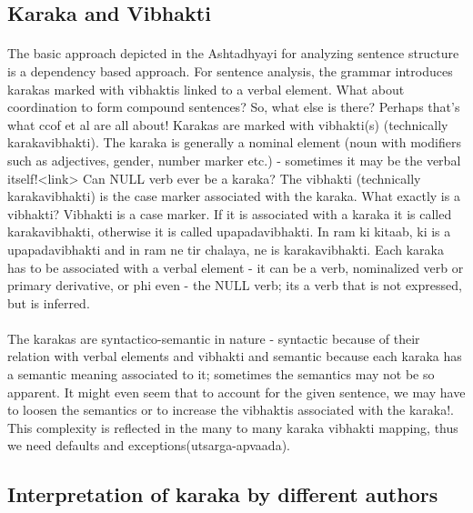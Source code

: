 \documentclass[a4paper,10pt]{article}
\begin{document}
\subsection{Karaka and Vibhakti}
\paragraph{}The basic approach depicted in the Ashtadhyayi for analyzing sentence structure is a dependency based approach. \color{blue!100}For sentence analysis, the grammar introduces karakas marked with vibhaktis linked to a verbal element. \color{red!100}What about coordination to form compound sentences? So, what else is there? \color{green!100}Perhaps that's what ccof et al are all about! \color{black!100}Karakas are marked with vibhakti(s) (technically karakavibhakti). \color{blue!100}The karaka is generally a nominal element (noun with modifiers such as adjectives, gender, number marker etc.) - \color{green!100}sometimes it may be the verbal itself!<link> \color{red!100}Can NULL verb ever be a karaka? \color{blue!100}The vibhakti (technically karakavibhakti) is the case marker associated with the karaka. \color{red!100}What exactly is a vibhakti? \color{blue!100}Vibhakti is a case marker. If it is associated with a karaka it is called karakavibhakti, otherwise it is called upapadavibhakti. \color{purple!100}In ram ki kitaab, ki is a upapadavibhakti and in ram ne tir chalaya, ne is karakavibhakti. \color{black!100}Each karaka has to be associated with a verbal element - it can be a verb, \color{blue!100}nominalized verb or primary derivative, or phi even - the NULL verb; its a verb that is not expressed, but is inferred.\paragraph{}\color{black!100}The karakas are syntactico-semantic in nature - \color{blue!100}syntactic because of their relation with verbal elements and vibhakti and semantic because each karaka has a semantic meaning associated to it; \color{red!100}sometimes the semantics may not be so apparent. It might even seem that to account for the given sentence, we may have to loosen the semantics or to increase the vibhaktis associated with the karaka!. \color{black!100}This complexity is reflected in the many to many karaka vibhakti mapping, thus we need defaults and exceptions(utsarga-apvaada).
\subsection{Interpretation of karaka by different authors}
\end{document}
